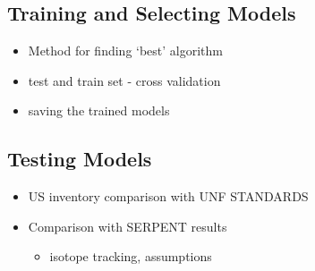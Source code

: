 \subsection{Training and Selecting Models}
\begin{itemize}
    \item Method for finding `best' algorithm
    \item test and train set - cross validation
    \item saving the trained models
\end{itemize}

\subsection{Testing Models}
\begin{itemize}
    \item US inventory comparison with UNF STANDARDS
    \item Comparison with SERPENT results
    \begin{itemize}
        \item isotope tracking, assumptions
    \end{itemize}
\end{itemize}
